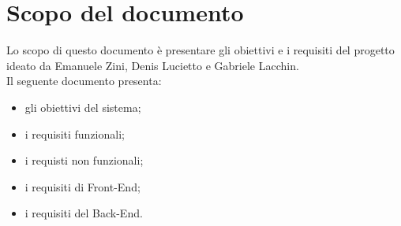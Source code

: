 \section*{Scopo del documento}
Lo scopo di questo documento è presentare gli obiettivi e i requisiti del progetto \nome ideato da Emanuele Zini, Denis Lucietto e Gabriele Lacchin.\\
Il seguente documento presenta:
\begin{itemize}
    \item gli obiettivi del sistema;
    \item i requisiti funzionali;
    \item i requisti non funzionali;
    \item i requisiti di Front-End;
    \item i requisiti del Back-End.
\end{itemize}